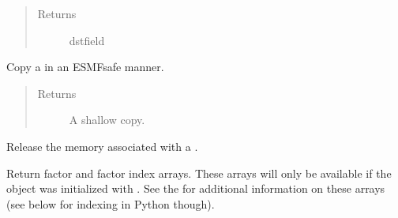 \documentclass[letterpaper,10pt,english]{sphinxmanual}
\begin{document}
\begin{fulllineitems}
\begin{fulllineitems}
\begin{quote}
\begin{description}
\item[{Returns}] \leavevmode
dstfield

\end{description}\end{quote}

\end{fulllineitems}


\begin{fulllineitems}
\label{\detokenize{regrid:ESMF.api.regrid.Regrid.copy}}
Copy a {\hyperref[\detokenize{regrid:ESMF.api.regrid.Regrid}]{}} in an ESMF\sphinxhyphen{}safe manner.
\begin{quote}\begin{description}
\item[{Returns}] \leavevmode
A {\hyperref[\detokenize{regrid:ESMF.api.regrid.Regrid}]{}} shallow copy.

\end{description}\end{quote}

\end{fulllineitems}


\begin{fulllineitems}
\label{\detokenize{regrid:ESMF.api.regrid.Regrid.destroy}}
Release the memory associated with a {\hyperref[\detokenize{regrid:ESMF.api.regrid.Regrid}]{}}.

\end{fulllineitems}


\begin{fulllineitems}
\label{\detokenize{regrid:ESMF.api.regrid.Regrid.get_factors}}
Return factor and factor index arrays. These arrays will only be
available if the  object was initialized with .
See the 
for additional information on these arrays (see below for indexing in
Python though).


\end{fulllineitems}
\end{fulllineitems}
\end{document}
